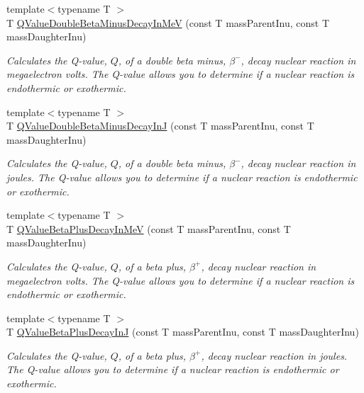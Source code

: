 \begin{DoxyCompactItemize}
{\footnotesize template$<$typename T $>$ }\\T \mbox{\hyperlink{group___e_g_x_phys-_q_value-_beta_minus_ga2678563115405a056c6bdccc9f2a9232}{Q\+Value\+Double\+Beta\+Minus\+Decay\+In\+MeV}} (const T mass\+Parent\+Inu, const T mass\+Daughter\+Inu)
\begin{DoxyCompactList}\small\item\em Calculates the Q-\/value, $Q$, of a double beta minus, $\beta^-$, decay nuclear reaction in megaelectron volts. The Q-\/value allows you to determine if a nuclear reaction is endothermic or exothermic. \end{DoxyCompactList}\item 
{\footnotesize template$<$typename T $>$ }\\T \mbox{\hyperlink{group___e_g_x_phys-_q_value-_beta_minus_ga5be6923812a1a701ed38965329dd6297}{Q\+Value\+Double\+Beta\+Minus\+Decay\+InJ}} (const T mass\+Parent\+Inu, const T mass\+Daughter\+Inu)
\begin{DoxyCompactList}\small\item\em Calculates the Q-\/value, $Q$, of a double beta minus, $\beta^-$, decay nuclear reaction in joules. The Q-\/value allows you to determine if a nuclear reaction is endothermic or exothermic. \end{DoxyCompactList}\item 
{\footnotesize template$<$typename T $>$ }\\T \mbox{\hyperlink{group___e_g_x_phys-_q_value-_beta_plus_ga3c4f7ec8e7c44d01d3aee6447a5ab443}{Q\+Value\+Beta\+Plus\+Decay\+In\+MeV}} (const T mass\+Parent\+Inu, const T mass\+Daughter\+Inu)
\begin{DoxyCompactList}\small\item\em Calculates the Q-\/value, $Q$, of a beta plus, $\beta^+$, decay nuclear reaction in megaelectron volts. The Q-\/value allows you to determine if a nuclear reaction is endothermic or exothermic. \end{DoxyCompactList}\item 
{\footnotesize template$<$typename T $>$ }\\T \mbox{\hyperlink{group___e_g_x_phys-_q_value-_beta_plus_gaaee51753f077c9fe05188aa5b24f642e}{Q\+Value\+Beta\+Plus\+Decay\+InJ}} (const T mass\+Parent\+Inu, const T mass\+Daughter\+Inu)
\begin{DoxyCompactList}\small\item\em Calculates the Q-\/value, $Q$, of a beta plus, $\beta^+$, decay nuclear reaction in joules. The Q-\/value allows you to determine if a nuclear reaction is endothermic or exothermic. \end{DoxyCompactList}\item 

\end{DoxyCompactItemize}

